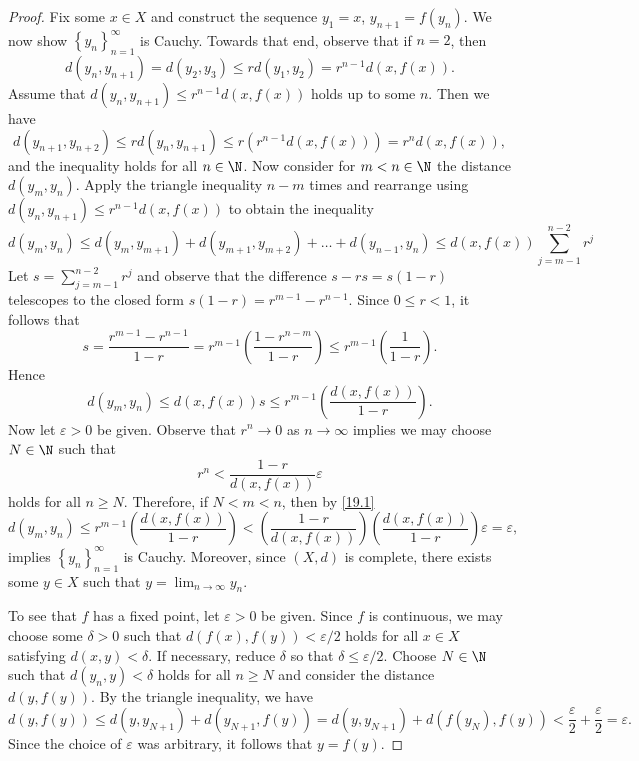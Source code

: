 \documentclass[12pt]{amsart}
\begin{document}
\begin{setup}
\begin{proof}
    Fix some $x \in X$ and construct the sequence $y_1 = x$, $y_{n+1} = f(y_n)$.
    We now show $\left\{y_n\right\}_{n=1}^\infty$ is Cauchy.
    Towards that end, observe that if $n=2$, then 
    $$d(y_n, y_{n+1}) = d(y_2, y_3) \leq rd(y_1, y_2) = r^{n-1}d(x,f(x)).$$
    Assume that $d(y_n, y_{n+1}) \leq r^{n-1} d(x,f(x))$ holds up to some $n$.
    Then we have $$d\left(y_{n+1}, y_{n+2}\right) \leq r d\left(y_n, y_{n+1}\right) \leq r\left(r^{n-1}d\left(x, f\left(x\right)\right)\right) = r^n d\left(x, f\left(x\right)\right),$$
    and the inequality holds for all $n \in \N$.
    Now consider for $m < n \in \N$ the distance $d\left(y_m, y_n\right)$.
    Apply the triangle inequality $n-m$ times and rearrange using $d(y_n, y_{n+1}) \leq r^{n-1} d\left(x,f\left(x\right)\right)$ to obtain the inequality 
    $$d(y_m, y_n) \leq d(y_m, y_{m+1}) + d(y_{m+1}, y_{m+2}) + \ldots + d(y_{n-1}, y_n) \leq d(x,f(x)) \sum_{j=m-1}^{n-2}r^j$$
    Let $s = \sum_{j=m-1}^{n-2}r^j$ and observe that the difference $s - rs = s(1-r)$ telescopes to the closed form $s(1-r) = r^{m-1} - r^{n-1}$. 
    Since $0 \leq r < 1$, it follows that  $$s = \frac{r^{m-1} - r^{n-1}}{1-r} = r^{m-1}\left(\frac{1 - r^{n-m}}{1-r}\right) \leq r^{m-1}\left(\frac{1}{1-r}\right).$$ 
    Hence %
    \begin{equation}\label{19.1}
      d(y_m, y_n) \leq d(x,f(x))s \leq r^{m-1}\left(\frac{d(x,f(x))}{1-r}\right).
    \end{equation}
    Now let $\varepsilon > 0$ be given.
    Observe that $r^n \rightarrow 0$ as $n \rightarrow \infty$ implies we may choose $N \in \N$ such that 
    $$r^{n} < \frac{1-r}{d(x,f(x))}\varepsilon$$
    holds for all $n \geq N$.
    Therefore, if $N < m < n$, then by \eqref{19.1}
    $$d(y_m, y_n) \leq r^{m-1}\left(\frac{d(x,f(x))}{1-r}\right) < \left(\frac{1-r}{d(x,f(x))}\right)\left(\frac{d(x,f(x))}{1-r}\right)\varepsilon = \varepsilon,$$
    implies $\left\{y_n\right\}_{n=1}^{\infty}$ is Cauchy.
    Moreover, since $(X,d)$ is complete, there exists some $y \in X$ such that $y = \lim_{n \rightarrow \infty} y_n$.
    
    To see that $f$ has a fixed point, let $\varepsilon > 0$ be given.
    Since $f$ is continuous, we may choose some $\delta > 0$ such that $d(f(x), f(y)) < \varepsilon/2$ holds for all $x \in X$ satisfying $d(x,y) < \delta$.
    If necessary, reduce $\delta$ so that $\delta \leq \varepsilon/2$.
    Choose $N \in \N$ such that $d(y_n, y) < \delta$ holds for all $n \geq N$ and consider the distance $d(y,f(y))$.
    By the triangle inequality, we have 
    $$d(y, f(y)) \leq d(y, y_{N+1}) + d(y_{N+1}, f(y)) = d(y, y_{N+1}) + d(f(y_N), f(y))< \frac{\varepsilon}{2} + \frac{\varepsilon}{2} = \varepsilon.$$
    Since the choice of $\varepsilon$ was arbitrary, it follows that $y = f(y)$.
    

\end{proof}
\end{setup}
\end{document}
